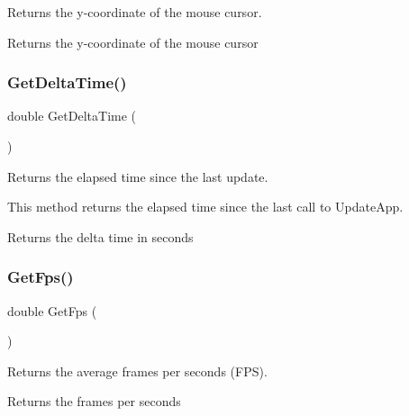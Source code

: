 Returns the y-\/coordinate of the mouse cursor.

\begin{DoxyReturn}{Returns}
the y-\/coordinate of the mouse cursor 
\end{DoxyReturn}
\mbox{\label{group__sdl__group_gaf9e3349b29171ad58521f5a7a6238fca}} 
\subsubsection{\texorpdfstring{Get\+Delta\+Time()}{GetDeltaTime()}}
{\footnotesize\ttfamily double Get\+Delta\+Time (\begin{DoxyParamCaption}{ }\end{DoxyParamCaption})}

Returns the elapsed time since the last update.

This method returns the elapsed time since the last call to Update\+App.

\begin{DoxyReturn}{Returns}
the delta time in seconds 
\end{DoxyReturn}
\mbox{\label{group__sdl__group_gaa48ddc248a57dfa1e4afdd6be2a76531}} 
\subsubsection{\texorpdfstring{Get\+Fps()}{GetFps()}}
{\footnotesize\ttfamily double Get\+Fps (\begin{DoxyParamCaption}{ }\end{DoxyParamCaption})}

Returns the average frames per seconds (F\+PS).

\begin{DoxyReturn}{Returns}
the frames per seconds 
\end{DoxyReturn}
\mbox{\label{group__sdl__group_ga236d5b80ee4ca0a1abe0ae054f7fbe2f}} 
